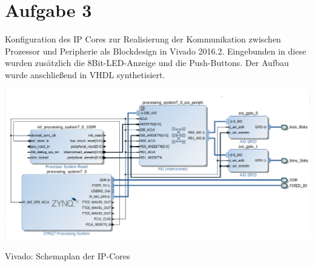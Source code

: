 \section{Aufgabe 3} \label{ex3}

Konfiguration des IP Cores zur Realisierung der Kommunikation zwischen Prozessor und 
Peripherie als Blockdesign in Vivado 2016.2. Eingebunden in diese wurden zusätzlich die 8Bit-LED-Anzeige und die Push-Buttons. Der Aufbau wurde anschließend in VHDL synthetisiert. 

\begin{minipage}{\textwidth}
    \begin{center}        
        \includegraphics[scale=0.6]{img/a3.png} 
    \end{center}
\end{minipage}
\begin{center}
Vivado: Schemaplan der IP-Cores
\end{center}

